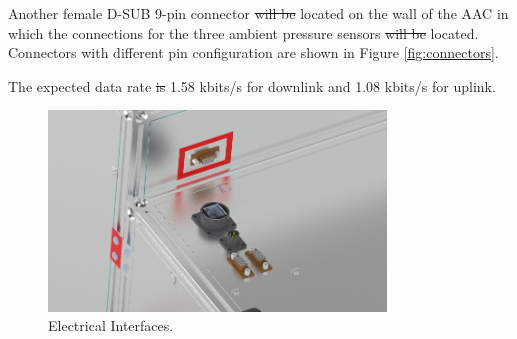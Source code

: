 \documentclass[a4paper,12pt,oneside]{article}
\providecommand{\DIFaddtex}[1]{{\protect\color{blue}\uwave{#1}}} %
\providecommand{\DIFdeltex}[1]{{\protect\color{red}\sout{#1}}}                      %
\providecommand{\DIFaddbegin}{} %
\providecommand{\DIFaddend}{} %
\providecommand{\DIFdelbegin}{} %
\providecommand{\DIFdelend}{} %
\providecommand{\DIFadd}[1]{\texorpdfstring{\DIFaddtex{#1}}{#1}} %
\providecommand{\DIFdel}[1]{\texorpdfstring{\DIFdeltex{#1}}{}} %
\newcommand{\DIFscaledelfig}{0.5}
\newlength{\DIFdelgraphicswidth} %
\newlength{\DIFdelgraphicsheight} %
\newcommand{\DIFaddincludegraphics}[2][]{{\color{blue}\fbox{\DIFOincludegraphics[#1]{#2}}}} %
\newcommand{\DIFdelincludegraphics}[2][]{%
\sbox{\DIFdelgraphicsbox}{\DIFOincludegraphics[#1]{#2}}%
\settoboxwidth{\DIFdelgraphicswidth}{\DIFdelgraphicsbox} %
\settoboxtotalheight{\DIFdelgraphicsheight}{\DIFdelgraphicsbox} %
\scalebox{\DIFscaledelfig}{%
\parbox[b]{\DIFdelgraphicswidth}{\usebox{\DIFdelgraphicsbox}\\[-\baselineskip] \rule{\DIFdelgraphicswidth}{0em}}\llap{\resizebox{\DIFdelgraphicswidth}{\DIFdelgraphicsheight}{%
\setlength{\unitlength}{\DIFdelgraphicswidth}%
\begin{picture}(1,1)%
\thicklines\linethickness{2pt} %
{\color[rgb]{1,0,0}\put(0,0){\framebox(1,1){}}}%
{\color[rgb]{1,0,0}\put(0,0){\line( 1,1){1}}}%
{\color[rgb]{1,0,0}\put(0,1){\line(1,-1){1}}}%
\end{picture}%
}\hspace*{3pt}}} %
} %
\DeclareRobustCommand{\DIFaddbegin}{\DIFOaddbegin \let\includegraphics\DIFaddincludegraphics} %
\DeclareRobustCommand{\DIFaddend}{\DIFOaddend \let\includegraphics\DIFOincludegraphics} %
\DeclareRobustCommand{\DIFdelbegin}{\DIFOdelbegin \let\includegraphics\DIFdelincludegraphics} %
\DeclareRobustCommand{\DIFdelend}{\DIFOaddend \let\includegraphics\DIFOincludegraphics} %
\begin{document}
Another female D-SUB 9-pin connector \DIFdelbegin \DIFdel{will be }\DIFdelend \DIFaddbegin \DIFadd{was }\DIFaddend located on the wall of the AAC in which the connections for the three ambient pressure sensors \DIFdelbegin \DIFdel{will be }\DIFdelend \DIFaddbegin \DIFadd{were }\DIFaddend located. Connectors with different pin configuration are shown in Figure \ref{fig:connectors}.

The expected data rate \DIFdelbegin \DIFdel{is }\DIFdelend \DIFaddbegin \DIFadd{was }\DIFaddend 1.58 kbits/s for downlink and 1.08 kbits/s for uplink.

\begin{figure}[H]
    \centering
    \includegraphics[width=0.8\textwidth]{4-experiment-design/img/Mechanical/Figure_Detail_Interfaces.png}
    \caption{Electrical Interfaces.}
    \label{fig:electrical_interfaces}
\end{figure}

\end{document}

